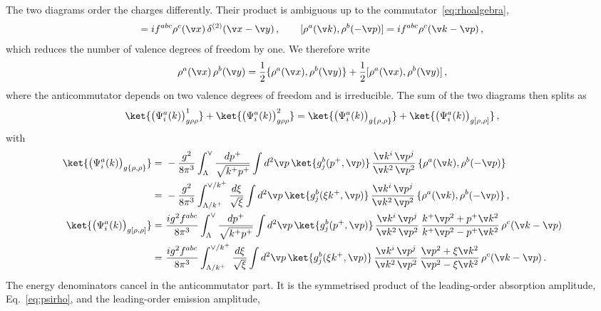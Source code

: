 The two diagrams order the charges differently. Their product is ambiguous up to the
commutator~\eqref{eq:rhoalgebra},
\begin{align}
[\rho^{a}(\v x),\rho^{b}(\v y)]=if^{abc}\rho^{c}(\v x)\,\delta^{(2)}(\v x-\v y)\,,\qquad
[\rho^{a}(\v k),\rho^{b}(-\v p)]=if^{abc}\rho^{c}(\v k-\v p)\,,
\end{align}
which reduces the number of valence degrees of freedom by one. We therefore write
\begin{align}
\rho^{a}(\v x)\,\rho^{b}(\v y)=\frac{1}{2}\{\rho^{a}(\v x),\rho^{b}(\v y)\}+\frac{1}{2}[\rho^{a}(\v x),\rho^{b}(\v y)]\,,
\end{align}
where the anticommutator depends on two valence degrees of freedom and is irreducible. The sum of the two
diagrams then splits as
\begin{align}
\ket{\big(\Psi^{a}_{i}(k)\big)^{1}_{g\rho\rho}}+\ket{\big(\Psi^{a}_{i}(k)\big)^{2}_{g\rho\rho}}
=\ket{\big(\Psi^{a}_{i}(k)\big)_{g\{\rho,\rho\}}}+\ket{\big(\Psi^{a}_{i}(k)\big)_{g[\rho,\rho]}}\,,
\end{align}
with
\begin{align}\label{onegrho3mom}
\ket{\big(\Psi^{a}_{i}(k)\big)_{g\{\rho,\rho\}}}
=\ &-\frac{g^{2}}{8\pi^{3}}\int_{\Lambda}^{\vee}\frac{dp^{+}}{\sqrt{k^{+}p^{+}}}\int d^{2}\v p\,\ket{g^{b}_{j}(p^{+},\v p)}\,
\frac{\v k^{i}\,\v p^{j}}{\v k^{2}\,\v p^{2}}\,\{\rho^{a}(\v k),\rho^{b}(-\v p)\}\notag\\
=\ &-\frac{g^{2}}{8\pi^{3}}\int_{\Lambda/k^{+}}^{\vee/k^{+}}\frac{d\xi}{\sqrt{\xi}}\int d^{2}\v p\,\ket{g^{b}_{j}(\xi k^{+},\v p)}\,
\frac{\v k^{i}\,\v p^{j}}{\v k^{2}\,\v p^{2}}\,\{\rho^{a}(\v k),\rho^{b}(-\v p)\}\,,\\
\ket{\big(\Psi^{a}_{i}(k)\big)_{g[\rho,\rho]}}
=\ &\frac{ig^{2}f^{abc}}{8\pi^{3}}\int_{\Lambda}^{\vee}\frac{dp^{+}}{\sqrt{k^{+}p^{+}}}\int d^{2}\v p\,\ket{g^{b}_{j}(p^{+},\v p)}\,
\frac{\v k^{i}\,\v p^{j}}{\v k^{2}\,\v p^{2}}\,\frac{k^{+}\v p^{2}+p^{+}\v k^{2}}{k^{+}\v p^{2}-p^{+}\v k^{2}}\,\rho^{c}(\v k-\v p)\notag\\
=\ &\frac{ig^{2}f^{abc}}{8\pi^{3}}\int_{\Lambda/k^{+}}^{\vee/k^{+}}\frac{d\xi}{\sqrt{\xi}}\int d^{2}\v p\,\ket{g^{b}_{j}(\xi k^{+},\v p)}\,
\frac{\v k^{i}\,\v p^{j}}{\v k^{2}\,\v p^{2}}\,\frac{\v p^{2}+\xi\v k^{2}}{\v p^{2}-\xi\v k^{2}}\,\rho^{c}(\v k-\v p)\,.\label{onegrho4mom}
\end{align}
The energy denominators cancel in the anticommutator part. It is the symmetrised product of the
leading-order absorption amplitude, Eq.~\eqref{eq:psirho}, and the leading-order emission amplitude,
